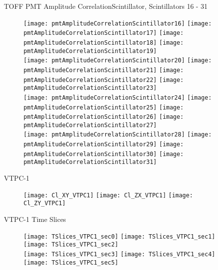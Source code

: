 \documentclass[11pt]{beamer}
\begin{document}
\begin{frame}{TOFF PMT Amplitude CorrelationScintillator, Scintillators 16 - 31}
\begin{figure}
\centering
\texttt{[image: pmtAmplitudeCorrelationScintillator16]}
\texttt{[image: pmtAmplitudeCorrelationScintillator17]}
\texttt{[image: pmtAmplitudeCorrelationScintillator18]}
\texttt{[image: pmtAmplitudeCorrelationScintillator19]} \\
\texttt{[image: pmtAmplitudeCorrelationScintillator20]}
\texttt{[image: pmtAmplitudeCorrelationScintillator21]}
\texttt{[image: pmtAmplitudeCorrelationScintillator22]}
\texttt{[image: pmtAmplitudeCorrelationScintillator23]} \\
\texttt{[image: pmtAmplitudeCorrelationScintillator24]}
\texttt{[image: pmtAmplitudeCorrelationScintillator25]}
\texttt{[image: pmtAmplitudeCorrelationScintillator26]}
\texttt{[image: pmtAmplitudeCorrelationScintillator27]} \\
\texttt{[image: pmtAmplitudeCorrelationScintillator28]}
\texttt{[image: pmtAmplitudeCorrelationScintillator29]}
\texttt{[image: pmtAmplitudeCorrelationScintillator30]}
\texttt{[image: pmtAmplitudeCorrelationScintillator31]} \\
\end{figure}
\end{frame}

\begin{frame}{VTPC-1}
\begin{figure}
\centering
\texttt{[image: Cl\_XY\_VTPC1]}
\texttt{[image: Cl\_ZX\_VTPC1]}
\texttt{[image: Cl\_ZY\_VTPC1]}
\end{figure}
\end{frame}

\begin{frame}{VTPC-1 Time Slices}
\begin{figure}
\centering
\texttt{[image: TSlices\_VTPC1\_sec0]}
\texttt{[image: TSlices\_VTPC1\_sec1]}
\texttt{[image: TSlices\_VTPC1\_sec2]}\\
\texttt{[image: TSlices\_VTPC1\_sec3]}
\texttt{[image: TSlices\_VTPC1\_sec4]}
\texttt{[image: TSlices\_VTPC1\_sec5]}
\end{figure}
\end{frame}
\end{document}
